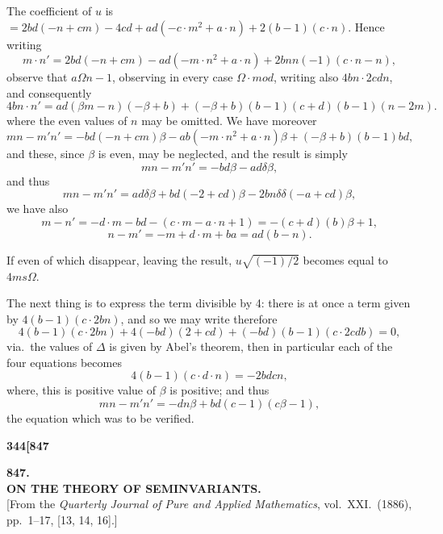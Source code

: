 \documentclass[12pt,a4paper]{article}
\theoremstyle{definition}
\begin{document}
\noindent The coefficient of $u$ is $= 2bd(-n + cm) - 4cd + ad(-c \cdot m^2 + a \cdot n) + 2(b - 1)(c \cdot n)$. Hence writing
\[
m \cdot n' = 2bd(-n + cm) - ad(-m \cdot n^2 + a \cdot n) + 2bnn(- 1)(c \cdot n - n),
\]
observe that $a\Omega n - 1$, observing in every case $\Omega \cdot mod$, writing also $4bn \cdot 2cdn$, and consequently
\[
4bn \cdot n' = ad(\beta m - n)(-\beta + b) + (-\beta + b)(b - 1)(c + d)(b - 1)(n - 2m).
\]
where the even values of $n$ may be omitted. We have moreover
\[
mn - m'n' = -bd(-n + cm)\beta - ab(-m \cdot n^2 + a \cdot n)\beta + (-\beta + b)(b - 1)bd,
\]
and these, since $\beta$ is even, may be neglected, and the result is simply
\[
mn - m'n' = -bd\beta - ad\delta\beta,
\]
and thus
\[
mn - m'n' = ad\delta\beta + bd(-2 + cd)\beta - 2bn\delta\delta(- a + cd)\beta,
\]
we have also
\[
m - n' = -d \cdot m - bd - (c \cdot m - a \cdot n + 1) = -(c + d)(b)\beta + 1,
\]
\[
n - m' = -m + d \cdot m + ba = ad(b - n).
\]

If even of which disappear, leaving the result, $u\sqrt{(-1)/2}$ becomes equal to $4ms\Omega$.

The next thing is to express the term divisible by 4: there is at once a term given by $4(b - 1)(c \cdot 2bn)$, and so we may write therefore
\[
4(b - 1)(c \cdot 2bn) + 4(- bd)(2 + cd) + (- bd)(b - 1)(c \cdot 2cdb) = 0,
\]
via.\ the values of $\Delta$ is given by Abel's theorem, then in particular each of the four equations becomes
\[
4(b - 1)(c \cdot d \cdot n) = -2bdcn,
\]
where, this is positive value of $\beta$ is positive; and thus
\[
mn - m'n' = -dn\beta + bd(c - 1)(c\beta - 1),
\]
the equation which was to be verified.

\vspace{2em}


\newpage
\setcounter{page}{344}

\noindent\textbf{344}\hfill\textbf{[847}

\bigskip

\begin{center}
{\Large\textbf{847.}}\\[1em]
{\large\textbf{ON THE THEORY OF SEMINVARIANTS.}}\\[1em]
[From the \textit{Quarterly Journal of Pure and Applied Mathematics}, vol.\ XXI.\ (1886), pp.\ 1--17, [13, 14, 16].]
\end{center}
\end{document}
